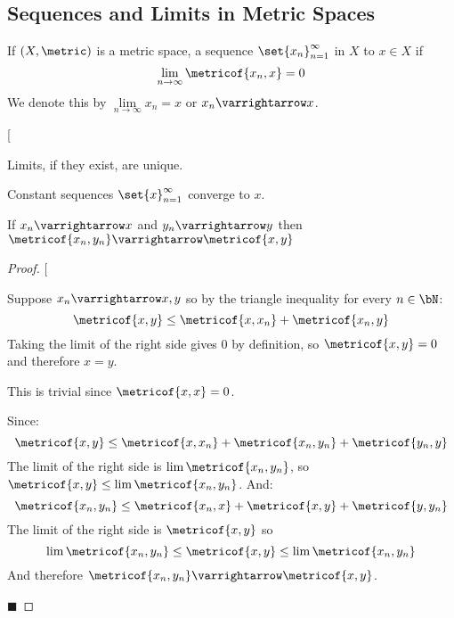 \documentclass[10pt]{article}
\makeatletter
\def\@blist[#1]{%
    \bgroup\bgroup\par\vskip-\medskipamount%
    \gdef\item{%
        \par\egroup\bgroup\medskip\setbox0=\hbox{#1\quad}%
        \advance\leftskip by \wd0\leavevmode\kern-\wd0\box0%
    }%
}
\def\blist{\@ifnextchar[ \@blist {\@blist[$\bullet$]}}
\def\elist{\par\egroup\egroup\medskip}
\makeatother
\begin{document}


\bigskip

\subsection{Sequences and Limits in Metric Spaces}

\begin{defn*}

    If $(X,\metric)$ is a metric space, a sequence $\set{x_n}_{n=1}^\infty$ in $X$  to $x\in X$ if
    \[ \lim_{n\to\infty}\metricof{x_n, x} = 0 \]
    We denote this by $\lim\limits_{n\to\infty}x_n=x$ or $x_n\varrightarrow x$.

\end{defn*}

\begin{prop*}

    \blist
        \item Limits, if they exist, are unique.
        \item Constant sequences $\set{x}_{n=1}^\infty$ converge to $x$.
        \item If $x_n\varrightarrow x$ and $y_n\varrightarrow y$ then $\metricof{x_n, y_n}\varrightarrow\metricof{x,y}$
    \elist

\end{prop*}

\begin{proof}

    \blist
        \item Suppose $x_n\varrightarrow x,y$ so by the triangle inequality for every $n\in\bN$:
            \[ \metricof{x,y} \leq \metricof{x,x_n} + \metricof{x_n,y} \]
            Taking the limit of the right side gives $0$ by definition, so $\metricof{x,y}=0$ and therefore $x=y$.
        \item This is trivial since $\metricof{x,x}=0$.
        \item Since:
            \[ \metricof{x,y} \leq \metricof{x, x_n} + \metricof{x_n, y_n} + \metricof{y_n, y} \]
            The limit of the right side is $\lim\metricof{x_n,y_n}$, so $\metricof{x,y}\leq\lim\metricof{x_n,y_n}$.
            And:
            \[ \metricof{x_n,y_n} \leq \metricof{x_n,x} + \metricof{x,y} + \metricof{y,y_n} \]
            The limit of the right side is $\metricof{x,y}$ so
            \[ \lim\metricof{x_n,y_n} \leq \metricof{x,y} \leq \lim\metricof{x_n,y_n} \]
            And therefore $\metricof{x_n,y_n}\varrightarrow\metricof{x,y}$.
    \elist

    \hfill$\blacksquare$

\end{proof}
\end{document}
